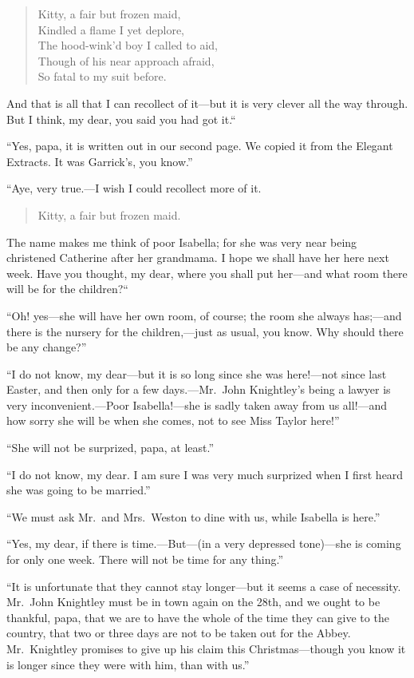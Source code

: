 \begin{verse}
    Kitty, a fair but frozen maid,\\
      Kindled a flame I yet deplore,\\
    The hood-wink'd boy I called to aid,\\
    Though of his near approach afraid,\\
      So fatal to my suit before.
\end{verse}

And that is all that I can recollect of it---but it is very clever
all the way through.  But I think, my dear, you said you had got it.``

``Yes, papa, it is written out in our second page.  We copied it
from the Elegant Extracts.  It was Garrick's, you know.''

``Aye, very true.---I wish I could recollect more of it.

\begin{verse}
    Kitty, a fair but frozen maid.
\end{verse}

The name makes me think of poor Isabella; for she was very near
being christened Catherine after her grandmama.  I hope we shall
have her here next week.  Have you thought, my dear, where you
shall put her---and what room there will be for the children?``

``Oh! yes---she will have her own room, of course; the room she always
has;---and there is the nursery for the children,---just as usual,
you know.  Why should there be any change?''

``I do not know, my dear---but it is so long since she was here!---not
since last Easter, and then only for a few days.---Mr.\ John Knightley's
being a lawyer is very inconvenient.---Poor Isabella!---she is sadly
taken away from us all!---and how sorry she will be when she comes,
not to see Miss Taylor here!''

``She will not be surprized, papa, at least.''

``I do not know, my dear.  I am sure I was very much surprized
when I first heard she was going to be married.''

``We must ask Mr.\ and Mrs.\ Weston to dine with us, while Isabella
is here.''

``Yes, my dear, if there is time.---But---(in a very depressed tone)---she
is coming for only one week.  There will not be time for any thing.''

``It is unfortunate that they cannot stay longer---but it seems a case
of necessity.  Mr.\ John Knightley must be in town again on the 28th,
and we ought to be thankful, papa, that we are to have the whole
of the time they can give to the country, that two or three days
are not to be taken out for the Abbey.  Mr.\ Knightley promises
to give up his claim this Christmas---though you know it is longer
since they were with him, than with us.''


